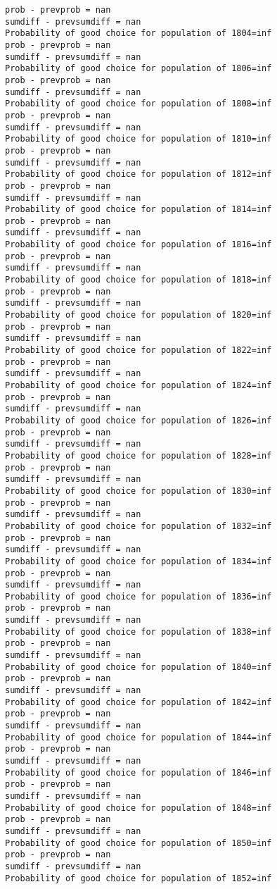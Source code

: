 \documentclass[11pt,onecolumn]{article}
\begin{document}
\begin{verbatim}
prob - prevprob = nan
sumdiff - prevsumdiff = nan
Probability of good choice for population of 1804=inf
prob - prevprob = nan
sumdiff - prevsumdiff = nan
Probability of good choice for population of 1806=inf
prob - prevprob = nan
sumdiff - prevsumdiff = nan
Probability of good choice for population of 1808=inf
prob - prevprob = nan
sumdiff - prevsumdiff = nan
Probability of good choice for population of 1810=inf
prob - prevprob = nan
sumdiff - prevsumdiff = nan
Probability of good choice for population of 1812=inf
prob - prevprob = nan
sumdiff - prevsumdiff = nan
Probability of good choice for population of 1814=inf
prob - prevprob = nan
sumdiff - prevsumdiff = nan
Probability of good choice for population of 1816=inf
prob - prevprob = nan
sumdiff - prevsumdiff = nan
Probability of good choice for population of 1818=inf
prob - prevprob = nan
sumdiff - prevsumdiff = nan
Probability of good choice for population of 1820=inf
prob - prevprob = nan
sumdiff - prevsumdiff = nan
Probability of good choice for population of 1822=inf
prob - prevprob = nan
sumdiff - prevsumdiff = nan
Probability of good choice for population of 1824=inf
prob - prevprob = nan
sumdiff - prevsumdiff = nan
Probability of good choice for population of 1826=inf
prob - prevprob = nan
sumdiff - prevsumdiff = nan
Probability of good choice for population of 1828=inf
prob - prevprob = nan
sumdiff - prevsumdiff = nan
Probability of good choice for population of 1830=inf
prob - prevprob = nan
sumdiff - prevsumdiff = nan
Probability of good choice for population of 1832=inf
prob - prevprob = nan
sumdiff - prevsumdiff = nan
Probability of good choice for population of 1834=inf
prob - prevprob = nan
sumdiff - prevsumdiff = nan
Probability of good choice for population of 1836=inf
prob - prevprob = nan
sumdiff - prevsumdiff = nan
Probability of good choice for population of 1838=inf
prob - prevprob = nan
sumdiff - prevsumdiff = nan
Probability of good choice for population of 1840=inf
prob - prevprob = nan
sumdiff - prevsumdiff = nan
Probability of good choice for population of 1842=inf
prob - prevprob = nan
sumdiff - prevsumdiff = nan
Probability of good choice for population of 1844=inf
prob - prevprob = nan
sumdiff - prevsumdiff = nan
Probability of good choice for population of 1846=inf
prob - prevprob = nan
sumdiff - prevsumdiff = nan
Probability of good choice for population of 1848=inf
prob - prevprob = nan
sumdiff - prevsumdiff = nan
Probability of good choice for population of 1850=inf
prob - prevprob = nan
sumdiff - prevsumdiff = nan
Probability of good choice for population of 1852=inf

\end{verbatim}
\end{document}
